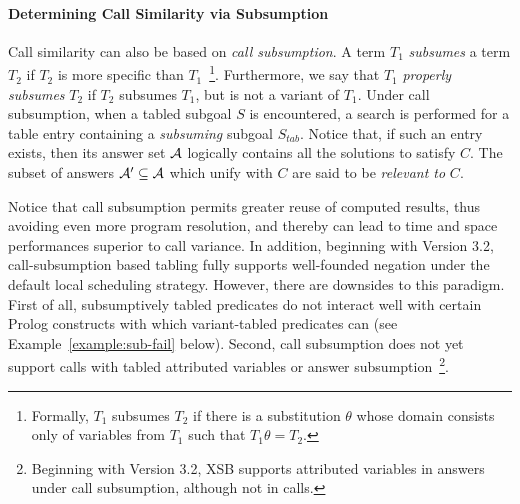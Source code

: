 

\paragraph{Determining Call Similarity via Subsumption}

Call similarity can also be based on {\em call subsumption}.  A term
$T_1$ \emph{subsumes} a term $T_2$ if $T_2$ is more specific than
$T_1$~\footnote{Formally, $T_1$ subsumes $T_2$ if there is a
  substitution $\theta$ whose domain consists only of variables from
  $T_1$ such that $T_1\theta = T_2$.}.  Furthermore, we say that $T_1$
\emph{properly subsumes} $T_2$ if $T_2$ subsumes $T_1$, but is not a
variant of $T_1$.  Under call subsumption, when a tabled subgoal $S$
is encountered, a search is performed for a table entry containing a
{\em subsuming} subgoal $S_{tab}$\@.  Notice that, if such an entry
exists, then its answer set ${\cal A}$ logically contains all the solutions
to satisfy $C$\@.  The subset of answers ${\cal A}' \subseteq {\cal A}$ which
unify with $C$ are said to be \emph{relevant to} $C$\@.  

Notice that call subsumption permits greater reuse of computed
results, thus avoiding even more program resolution, and thereby can
lead to time and space performances superior to call variance.  In
addition, beginning with Version 3.2, call-subsumption based tabling
fully supports well-founded negation under the default local
scheduling strategy.  However, there are downsides to this paradigm.
First of all, subsumptively tabled predicates do not interact well
with certain Prolog constructs with which variant-tabled predicates
can (see Example~\ref{example:sub-fail} below).  Second, call
subsumption does not yet support calls with tabled attributed
variables or answer subsumption~\footnote{Beginning with Version 3.2,
  XSB supports attributed variables in answers under call subsumption,
  although not in calls.}.

